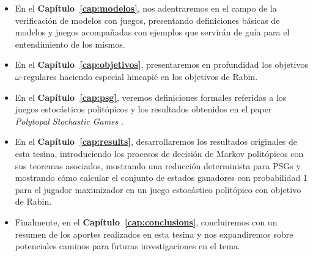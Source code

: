 \begin{itemize}
	\item En el \textbf{Capítulo~\ref{cap:modelos}}, nos adentraremos en el campo de la
	      verificación de modelos con juegos, presentando definiciones básicas de modelos
	      y juegos acompañadas con ejemplos que servirán de guía para el entendimiento de
	      los mismos.

	\item En el \textbf{Capítulo~\ref{cap:objetivos}}, presentaremos en profundidad los
	      objetivos $\omega$-regulares haciendo especial hincapié en los objetivos de
	      Rabin.

	\item En el \textbf{Capítulo~\ref{cap:psg}}, veremos definiciones formales referidas
	      a los juegos estocásticos politópicos y los resultados obtenidos en el paper
	      \textit{Polytopal Stochastic Games} \cite{Polytopal}.

	\item En el \textbf{Capítulo~\ref{cap:results}}, desarrollaremos los resultados
	      originales de esta tesina, introduciendo los procesos de decisión de Markov
	      politópicos con sus teoremas asociados, mostrando una reducción determinista
	      para PSGs y mostrando cómo calcular el conjunto de estados ganadores con
	      probabilidad 1 para el jugador maximizador en un juego estocástico politópico
	      con objetivo de Rabin.

	\item Finalmente, en el \textbf{Capítulo~\ref{cap:conclusions}}, concluiremos con un
	      resumen de los aportes realizados en esta tesina y nos expandiremos sobre
	      potenciales caminos para futuras investigaciones en el tema.

\end{itemize}

